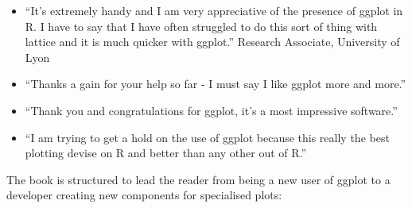 \documentclass[oneside,letterpaper]{scrartcl}
\begin{document}
\begin{itemize}
  \item ``It's extremely handy and I am very appreciative of the presence of ggplot in R.  I have to say that I have often struggled to do this sort of thing with lattice and it is much quicker with ggplot.'' Research Associate, University of Lyon

  \item ``Thanks a gain for your help so far - I must say I like ggplot more and more.''

  \item ``Thank you and congratulations for ggplot, it's a most impressive software.''

  \item ``I am trying to get a hold on the use of ggplot because this really the best plotting devise on R and better than any other out of R.''
\end{itemize}

The book is structured to lead the reader from being a new user of ggplot to a developer creating new components for specialised plots:
\end{document}
